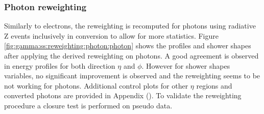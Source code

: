 \subsubsection{Photon reweighting}
Similarly to electrons, the reweighting is recomputed for photons using radiative Z events inclusively in conversion to allow for more statistics. Figure \ref{fig:gamma:ss:reweighting:photon:photon} shows the profiles and shower shapes after applying the derived reweighting on photons. A good agreement is observed in energy profiles for both direction $\eta$ and $\phi$. However for shower shapes variables, no significant improvement is observed and the reweighting seems to be not working for photons. Additional control plots for other $\eta$ regions and converted photons are provided in Appendix (). To validate the reweighting procedure a closure test is performed on pseudo data.
